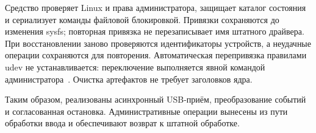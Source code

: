 \par\noindent\begin{minipage}{\linewidth}

\end{minipage}\par

Средство  проверяет Linux и права администратора, защищает каталог состояния и сериализует команды файловой блокировкой. Привязки сохраняются до изменения sysfs; повторная привязка не перезаписывает имя штатного драйвера. При восстановлении заново проверяются идентификаторы устройств, а неудачные операции сохраняются для повторения. Автоматическая перепривязка правилами udev не устанавливается: переключение выполняется явной командой администратора~\cite{udev}. Очистка артефактов не требует заголовков ядра.

Таким образом, реализованы асинхронный USB-приём, преобразование событий и согласованная остановка. Административные операции вынесены из пути обработки ввода и обеспечивают возврат к штатной обработке.

\clearpage
